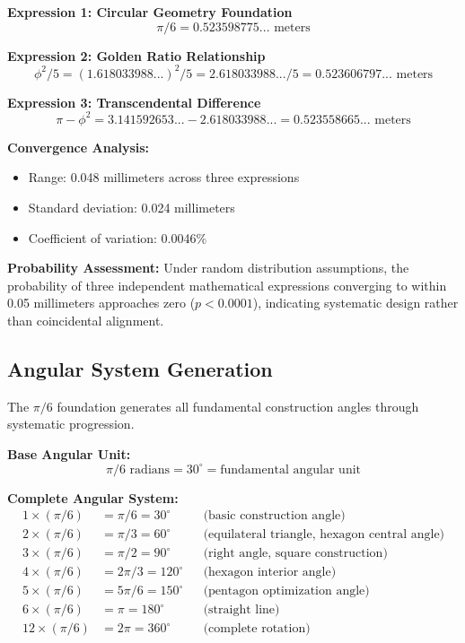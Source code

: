 \documentclass[11pt]{article}
\begin{document}
\textbf{Expression 1: Circular Geometry Foundation}
\[ \pi/6 = 0.523598775... \text{ meters} \]

\textbf{Expression 2: Golden Ratio Relationship}
\[ \phi^2/5 = (1.618033988...)^2/5 = 2.618033988.../5 = 0.523606797... \text{ meters} \]

\textbf{Expression 3: Transcendental Difference}
\[ \pi - \phi^2 = 3.141592653... - 2.618033988... = 0.523558665... \text{ meters} \]

\textbf{Convergence Analysis:}
\begin{itemize}
    \item Range: 0.048 millimeters across three expressions
    \item Standard deviation: 0.024 millimeters
    \item Coefficient of variation: 0.0046\%
\end{itemize}

\textbf{Probability Assessment:}
Under random distribution assumptions, the probability of three independent mathematical expressions converging to within 0.05 millimeters approaches zero ($p < 0.0001$), indicating systematic design rather than coincidental alignment.

\subsection{Angular System Generation}
The $\pi/6$ foundation generates all fundamental construction angles through systematic progression.

\textbf{Base Angular Unit:}
\[ \pi/6 \text{ radians} = 30^\circ = \text{fundamental angular unit} \]

\textbf{Complete Angular System:}
\begin{align*}
1 \times (\pi/6) &= \pi/6 = 30^\circ && \text{(basic construction angle)} \\
2 \times (\pi/6) &= \pi/3 = 60^\circ && \text{(equilateral triangle, hexagon central angle)} \\
3 \times (\pi/6) &= \pi/2 = 90^\circ && \text{(right angle, square construction)} \\
4 \times (\pi/6) &= 2\pi/3 = 120^\circ && \text{(hexagon interior angle)} \\
5 \times (\pi/6) &= 5\pi/6 = 150^\circ && \text{(pentagon optimization angle)} \\
6 \times (\pi/6) &= \pi = 180^\circ && \text{(straight line)} \\
12 \times (\pi/6) &= 2\pi = 360^\circ && \text{(complete rotation)}
\end{align*}
\end{document}
